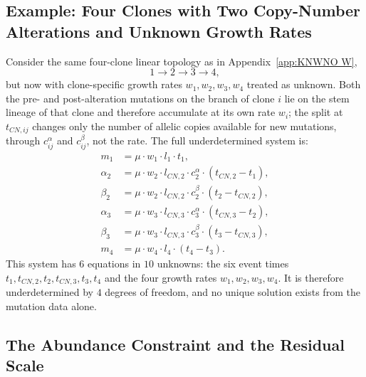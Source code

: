 \subsection*{Example: Four Clones with Two Copy-Number Alterations and Unknown 
Growth Rates}

Consider the same four-clone linear topology as in Appendix~\ref{app:KNWNO W},
%
\begin{equation}
    1 \longrightarrow 2 \longrightarrow 3 \longrightarrow 4,
\end{equation}
%
but now with clone-specific growth rates $w_1, w_2, w_3, w_4$ treated as unknown. 
Both the pre- and post-alteration mutations on the branch of clone $i$ lie on the
stem lineage of that clone and therefore accumulate at its own rate $w_i$; the split
at $t_{CN,ij}$ changes only the number of allelic copies available for new mutations,
through $c^\alpha_{ij}$ and $c^\beta_{ij}$, not the rate. The full underdetermined
system is:
%
\begin{align}
    m_1 &= \mu \cdot w_1 \cdot l_1 \cdot t_1, \\[4pt]
    \alpha_2 &= \mu \cdot w_2 \cdot l_{CN,2} \cdot c^\alpha_2
    \cdot (t_{CN,2} - t_1), \\[4pt]
    \beta_2 &= \mu \cdot w_2 \cdot l_{CN,2} \cdot c^\beta_2 
    \cdot (t_2 - t_{CN,2}), \\[4pt]
    \alpha_3 &= \mu \cdot w_3 \cdot l_{CN,3} \cdot c^\alpha_3
    \cdot (t_{CN,3} - t_2), \\[4pt]
    \beta_3 &= \mu \cdot w_3 \cdot l_{CN,3} \cdot c^\beta_3 
    \cdot (t_3 - t_{CN,3}), \\[4pt]
    m_4 &= \mu \cdot w_4 \cdot l_4 \cdot (t_4 - t_3).
\end{align}
%
This system has $6$ equations in $10$ unknowns: the six event times
$t_1, t_{CN,2}, t_2, t_{CN,3}, t_3, t_4$ and the four growth rates
$w_1, w_2, w_3, w_4$. It is therefore underdetermined by $4$ degrees of freedom,
and no unique solution exists from the mutation data alone.

\subsection*{The Abundance Constraint and the Residual Scale}

